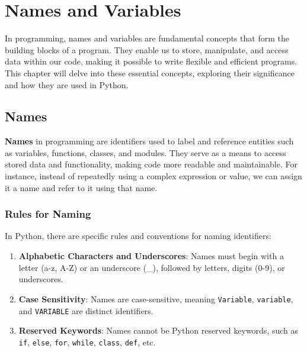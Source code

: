 \documentclass[
  letterpaper,
  DIV=11,
  numbers=noendperiod]{scrreprt}
\providecommand{\tightlist}{%
  \setlength{\itemsep}{0pt}\setlength{\parskip}{0pt}}\usepackage{longtable,booktabs,array}
\begin{document}

\hypertarget{names-and-variables}{%
\chapter{Names and Variables}\label{names-and-variables}}

In programming, names and variables are fundamental concepts that form
the building blocks of a program. They enable us to store, manipulate,
and access data within our code, making it possible to write flexible
and efficient programs. This chapter will delve into these essential
concepts, exploring their significance and how they are used in Python.

\hypertarget{sec-names}{%
\section{Names}\label{sec-names}}

\textbf{Names} in programming are identifiers used to label and
reference entities such as variables, functions, classes, and modules.
They serve as a means to access stored data and functionality, making
code more readable and maintainable. For instance, instead of repeatedly
using a complex expression or value, we can assign it a name and refer
to it using that name.

\hypertarget{rules-for-naming}{%
\subsection{Rules for Naming}\label{rules-for-naming}}

In Python, there are specific rules and conventions for naming
identifiers:

\begin{enumerate}
\def\labelenumi{\arabic{enumi}.}
\tightlist
\item
  \textbf{Alphabetic Characters and Underscores}: Names must begin with
  a letter (a-z, A-Z) or an underscore (\_), followed by letters, digits
  (0-9), or underscores.
\item
  \textbf{Case Sensitivity}: Names are case-sensitive, meaning
  \texttt{Variable}, \texttt{variable}, and \texttt{VARIABLE} are
  distinct identifiers.
\item
  \textbf{Reserved Keywords}: Names cannot be Python reserved keywords,
  such as \texttt{if}, \texttt{else}, \texttt{for}, \texttt{while},
  \texttt{class}, \texttt{def}, etc.
\end{enumerate}
\end{document}
